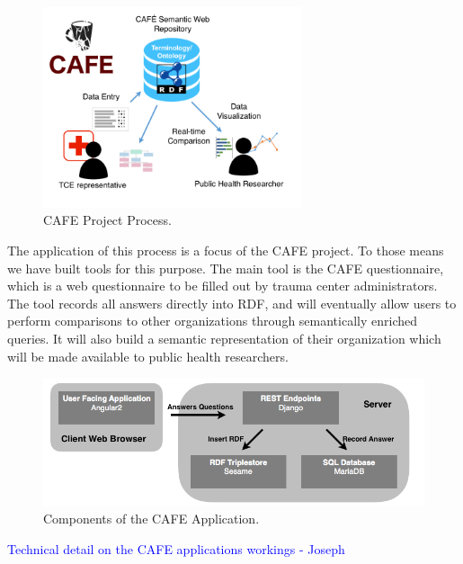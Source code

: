 \documentclass{amia}
\begin{document}
\begin{figure}
  \begin{center}
    \includegraphics[width=0.68\textwidth]{pics/cafe_figure.png}
  \end{center}
  \caption{CAFE Project Process.}
  \label{cafe_figure}
\end{figure}

The application of this process is a focus of the CAFE project.
To those means we have built tools for this purpose.
The main tool is the CAFE questionnaire, which is a web questionnaire to be filled out by trauma center administrators.
The tool records all answers directly into RDF, and will eventually allow users to perform comparisons to other organizations through semantically enriched queries.
It will also build a semantic representation of their organization which will be made available to public health researchers.

\pagebreak

\begin{figure}[h!]
  \centering
  \includegraphics[width=1\textwidth]{pics/cafe_process.png}
  \caption{Components of the CAFE Application.}
  \label{cafe_process}
\end{figure}

\textcolor{blue}{Technical detail on the CAFE applications workings - Joseph}
\end{document}
